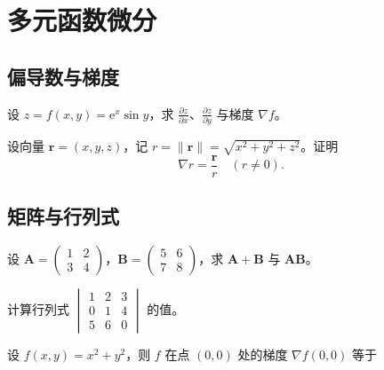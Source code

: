 \documentclass[answers]{kiritex}
\begin{document}
\section{多元函数微分}

\subsection{偏导数与梯度}

\begin{problem}
  设 $z=f(x,y)=\mathrm{e}^{x}\sin y$，求 $\displaystyle\frac{\partial z}{\partial x}$、$\displaystyle\frac{\partial z}{\partial y}$ 与梯度 $\nabla f$。
\end{problem}

\begin{problem}
  设向量 $\bm{r}=(x,y,z)$，记 $r=\lVert\bm{r}\rVert=\sqrt{x^{2}+y^{2}+z^{2}}$。证明
  \[
  \nabla r=\frac{\bm{r}}{r}\quad(r\neq 0).
  \]
\end{problem}

\subsection{矩阵与行列式}

\begin{problem}
  设 $\bm{A}=\begin{pmatrix}1&2\\3&4\end{pmatrix}$，$\bm{B}=\begin{pmatrix}5&6\\7&8\end{pmatrix}$，求 $\bm{A}+\bm{B}$ 与 $\bm{AB}$。
\end{problem}

\begin{problem}
  计算行列式 $\begin{vmatrix}1&2&3\\0&1&4\\5&6&0\end{vmatrix}$ 的值。
\end{problem}

\begin{problemchoice}
  设 $f(x,y)=x^{2}+y^{2}$，则 $f$ 在点 $(0,0)$ 处的梯度 $\nabla f(0,0)$ 等于
\end{problemchoice}
\end{document}
